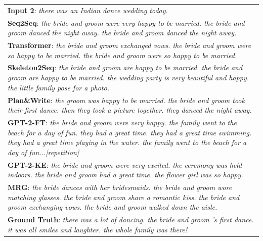 \documentclass[letterpaper]{article} %
\begin{document}
\begin{table}[!t]
{\begin{tabular}{|p{1.00\linewidth}|}
    \textbf{Input 2}: \textsl{there was an Indian dance wedding today.}\\
      \textbf{Seq2Seq}:  \textsl{the bride and groom were very happy to be married. the bride and groom danced the night away. the bride and groom danced the night away.}    \\  
        \textbf{Transformer}: \textsl{the bride and groom exchanged vows. the bride and groom were so happy to be married. the bride and groom were so happy to be married.}\\
      \textbf{Skeleton2Seq}: \textsl{the bride and groom are happy to be married. the bride and groom are happy to be married. the wedding party is very beautiful and happy. the little family pose for a photo.}\\ 
      \textbf{Plan\&Write}: \textsl{the groom was happy to be married. the bride and groom took their first dance. then they took a picture together. they danced the night away.}\\ 
      \textbf{GPT-2-FT}: \textsl{the bride and groom were very happy. the family went to the beach for a day of fun. they had a great time. they had a great time swimming. they had a great time playing in the water. the family went to the beach for a day of fun...[repetition]}\\ 
      \textbf{GPT-2-KE}: \textsl{the bride and groom were very excited. the ceremony was held indoors. the bride and groom had a great time. the flower girl was so happy.}\\       
 
      
    \textbf{MRG}: \textsl{the bride dances with her bridesmaids. the bride and groom wore matching glasses. the bride and groom share a romantic kiss. the bride and groom exchanging vows. the bride and groom walked down the aisle.}\\ 
     \textbf{Ground Truth}: \textsl{there was a lot of dancing. the bride and groom 's first dance. it was all smiles and laughter. the whole family was there!}\\
    
    \hline%

    

\end{tabular}}
\end{table}
\end{document}
